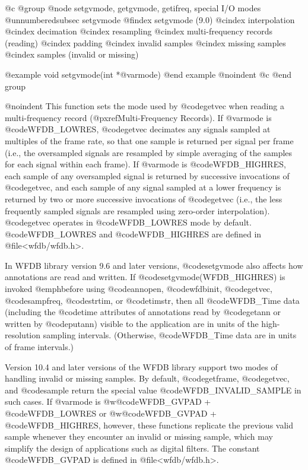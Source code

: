 {{{{{{{{@c @group
@node     setgvmode, getgvmode, getifreq, special I/O modes
@unnumberedsubsec setgvmode
@findex setgvmode (9.0)
@cindex interpolation
@cindex decimation
@cindex resampling
@cindex multi-frequency records (reading)
@cindex padding
@cindex invalid samples
@cindex missing samples
@cindex samples (invalid or missing)

@example
void setgvmode(int *@var{mode})
@end example
@noindent
@c @end group

@noindent
This function sets the mode used by @code{getvec} when reading a
multi-frequency record (@pxref{Multi-Frequency Records}).  If @var{mode} is
@code{WFDB_LOWRES}, @code{getvec} decimates any signals sampled at multiples of
the frame rate, so that one sample is returned per signal per frame (i.e., the
oversampled signals are resampled by simple averaging of the samples for each
signal within each frame).  If @var{mode} is @code{WFDB_HIGHRES}, each sample
of any oversampled signal is returned by successive invocations of
@code{getvec}, and each sample of any signal sampled at a lower frequency is
returned by two or more successive invocations of @code{getvec} (i.e., the less
frequently sampled signals are resampled using zero-order interpolation).
@code{getvec} operates in @code{WFDB_LOWRES} mode by default.
@code{WFDB_LOWRES} and @code{WFDB_HIGHRES} are defined in @file{<wfdb/wfdb.h>}.

In WFDB library version 9.6 and later versions, @code{setgvmode} also affects
how annotations are read and written.  If @code{setgvmode(WFDB_HIGHRES)} is
invoked @emph{before} using @code{annopen}, @code{wfdbinit}, @code{getvec},
@code{sampfreq}, @code{strtim}, or @code{timstr}, then all @code{WFDB_Time}
data (including the @code{time} attributes of annotations read by @code{getann}
or written by @code{putann}) visible to the application are in units of the
high-resolution sampling intervals.  (Otherwise, @code{WFDB_Time} data are in
units of frame intervals.)

Version 10.4 and later versions of the WFDB library support two modes
of handling invalid or missing samples.  By default, @code{getframe},
@code{getvec}, and @code{sample} return the special value
@code{WFDB_INVALID_SAMPLE} in such cases.  If @var{mode} is
@w{@code{WFDB_GVPAD} + @code{WFDB_LOWRES}} or 
@w{@code{WFDB_GVPAD} + @code{WFDB_HIGHRES}},
however, these functions replicate the previous
valid sample whenever they encounter an invalid or missing sample,
which may simplify the design of applications such as digital filters.
The constant @code{WFDB_GVPAD} is defined in @file{<wfdb/wfdb.h>}.

}}}}}}}}
